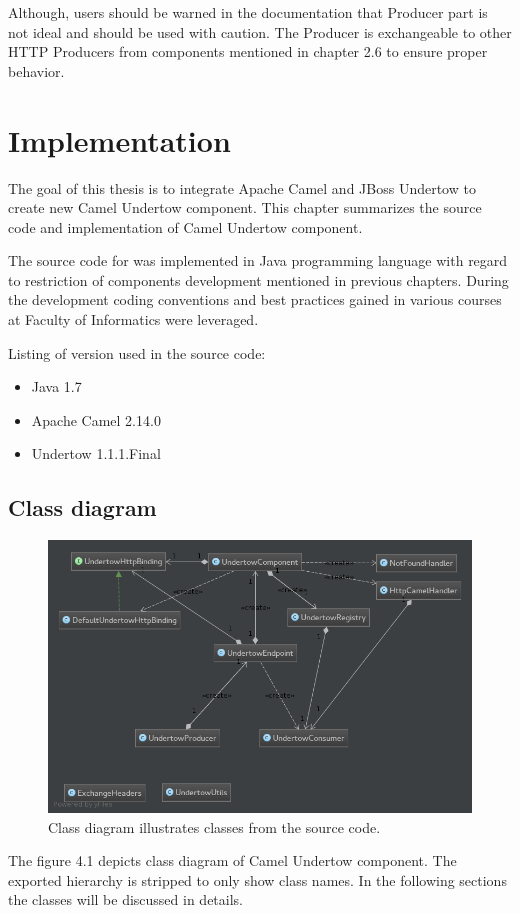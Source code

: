 \documentclass[12pt,final,oneside]{fithesis2}
\begin{document}
Although, users should be warned in the documentation that Producer part is not ideal and should be used with caution. The Producer is exchangeable to other HTTP Producers from components mentioned in chapter 2.6 to ensure proper behavior.



\chapter{Implementation}
 The goal of this thesis is to integrate Apache Camel and JBoss Undertow to create new Camel Undertow component. This chapter summarizes the source code and implementation of Camel Undertow component.

The source code for was implemented in Java programming language with regard to restriction of components development mentioned in previous chapters. During the development coding conventions and best practices gained in various courses at Faculty of Informatics were leveraged.

Listing of version used in the source code:
\begin{itemize}
\item Java 1.7
\item Apache Camel 2.14.0
\item Undertow 1.1.1.Final
\end{itemize}
\section{Class diagram}
\begin{figure}[!h]
\centering
\includegraphics[width=0.91\linewidth]{images/classDiagram.png}
\caption{Class diagram illustrates classes from the source code.}
\end{figure}
The figure 4.1 depicts class diagram of Camel Undertow component. The exported hierarchy is stripped to only show class names. In the following sections the classes will be discussed in details.
\end{document}
